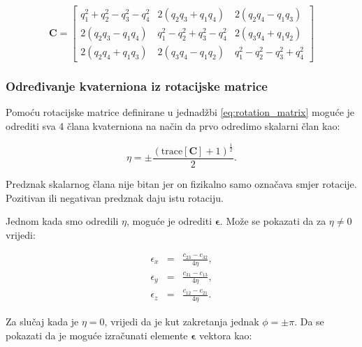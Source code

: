 \documentclass[times, utf8, diplomski, numeric]{templates/template}
\begin{document}
{{{            \begin{equation}
                \boldsymbol{C} =
                \begin{bmatrix}
                    q_1^2 + q_2^2 - q_3^2 - q_4^2 & 2(q_2q_3 + q_1q_4) & 2(q_2q_4 - q_1q_3) \\
                    2(q_2q_3 - q_1q_4) & q_1^2 - q_2^2 + q_3^2 - q_4^2 & 2(q_3q_4 + q_1q_2) \\
                    2(q_2q_4 + q_1q_3) & 2(q_3q_4 - q_1q_2) & q_1^2 - q_2^2 - q_3^2 + q_4^2 
                \end{bmatrix}
            \label{eq:rot_mat_quat}
            \end{equation}

            \subsubsection{Određivanje kvaterniona iz rotacijske matrice}{
                Pomoću rotacijske matrice definirane u jednadžbi \ref{eq:rotation_matrix} moguće je odrediti sva 4 člana kvaterniona na način da prvo odredimo skalarni član kao:

                \begin{equation}
                    \eta = \pm\frac{(\text{trace}[\boldsymbol{C}] + 1)^{\frac{1}{2}}}{2}.
                \end{equation}

                Predznak skalarnog člana nije bitan jer on fizikalno samo označava smjer rotacije. Pozitivan ili negativan predznak daju istu rotaciju.

                Jednom kada smo odredili $\eta$, moguće je odrediti $\boldsymbol\epsilon$. Može se pokazati da za $\eta \neq 0$ vrijedi:

                \begin{equation}
                \begin{array}{rcl}
                    \epsilon_{x} & = & \frac{c_{23} - c_{32}}{4\eta}, \\
                    \epsilon_{y} & = & \frac{c_{31} - c_{13}}{4\eta}, \\
                    \epsilon_{z} & = & \frac{c_{12} - c_{21}}{4\eta}.
                \end{array}
                \end{equation}

                Za slučaj kada je $\eta=0$, vrijedi da je kut zakretanja jednak $\phi=\pm\pi$. Da se pokazati da je moguće izračunati elemente $\boldsymbol\epsilon$ vektora kao:

}}}}
\end{document}
